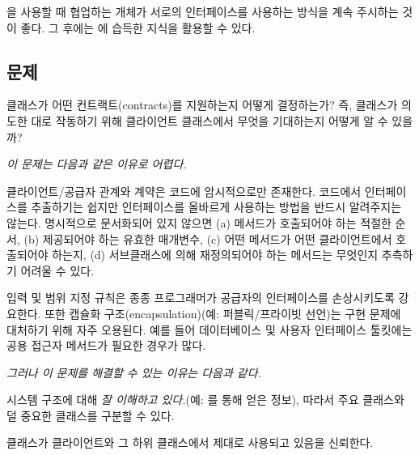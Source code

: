 \documentclass[a4paper,10pt,twoside]{book}
\begin{document}
을 사용할 때 협업하는 개체가 서로의 인터페이스를 사용하는 방식을 계속 주시하는 것이 좋다. 그 후에는 에 습득한 지식을 활용할 수 있다.



\subsection*{문제}

클래스가 어떤 컨트랙트(contracts)를 지원하는지 어떻게 결정하는가? 즉, 클래스가 의도한 대로 작동하기 위해 클라이언트 클래스에서 무엇을 기대하는지 어떻게 알 수 있을까?

\emph{이 문제는 다음과 같은 이유로 어렵다.}

\begin{bulletlist}
\item 클라이언트/공급자 관계와 계약은 코드에 암시적으로만 존재한다. 코드에서 인터페이스를 추출하기는 쉽지만 인터페이스를 올바르게 사용하는 방법을 반드시 알려주지는 않는다. 명시적으로 문서화되어 있지 않으면 (a) 메서드가 호출되어야 하는 적절한 순서, (b) 제공되어야 하는 유효한 매개변수, (c) 어떤 메서드가 어떤 클라이언트에서 호출되어야 하는지, (d) 서브클래스에 의해 재정의되어야 하는 메서드는 무엇인지 추측하기 어려울 수 있다.

\item 입력 및 범위 지정 규칙은 종종 프로그래머가 공급자의 인터페이스를 손상시키도록 강요한다. 또한 캡슐화 구조(encapsulation)(예: 퍼블릭/프라이빗 선언)는 구현 문제에 대처하기 위해 자주 오용된다. 예를 들어 데이터베이스 및 사용자 인터페이스 툴킷에는 공용 접근자 메서드가 필요한 경우가 많다.
\end{bulletlist}

\emph{그러나 이 문제를 해결할 수 있는 이유는 다음과 같다.}

\begin{bulletlist}
\item 시스템 구조에 대해 \emph{잘 이해하고 있다.}(예: 를 통해 얻은 정보), 따라서 주요 클래스와 덜 중요한 클래스를 구분할 수 있다.

\item 클래스가 클라이언트와 그 하위 클래스에서 제대로 사용되고 있음을 신뢰한다.
\end{bulletlist}
\end{document}
